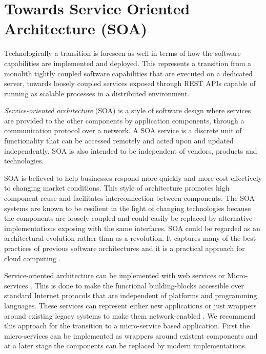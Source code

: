 	\section{Towards Service Oriented Architecture (SOA)}
	\label{sec:soa}
	
	Technologically a transition is foreseen as well in terms of how the software capabilities are implemented and deployed. This represents a transition from a monolith tightly coupled software capabilities that are executed on a dedicated server, towards loosely coupled services exposed through REST APIs capable of running as scalable processes in a distributed environment.
	
	\textit{Service-oriented architecture} (SOA) \cite{open2016soa} is a style of software design where services are provided to the other components by application components, through a communication protocol over a network. A SOA service is a discrete unit of functionality that can be accessed remotely and acted upon and updated independently. SOA is also intended to be independent of vendors, products and technologies.
	
	SOA is believed to help businesses respond more quickly and more cost-effectively to changing market conditions. This style of architecture promotes high component reuse and facilitates interconnection between components. The SOA systems are known to be resilient in the light of changing technologies because the components are loosely coupled and could easily be replaced by alternative implementations exposing with the same interfaces.	SOA could be regarded as an architectural evolution rather than as a revolution. It captures many of the best practices of previous software architectures and it is a practical approach for cloud computing \citep{velte2019cloud}.
	
	Service-oriented architecture can be implemented with web services or Micro-services \citep{brandner2004web}. This is done to make the functional building-blocks accessible over standard Internet protocols that are independent of platforms and programming languages. These services can represent either new applications or just wrappers around existing legacy systems to make them network-enabled \citep{channabasavaiah2003migrating}. We recommend this approach for the transition to a micro-service based application. First the micro-services can be implemented as wrappers around existent components and at a later stage the components can be replaced by modern implementations. 
